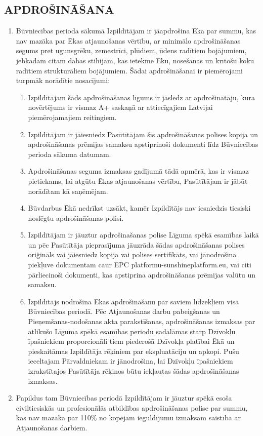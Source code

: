 \begin{multicols}{2}
\subsection{APDROŠINĀŠANA}
\begin{enumerate}
	\item Būvniecības perioda sākumā Izpildītājam ir jāapdrošina Ēka par summu, kas nav mazāka par Ēkas atjaunošanas vērtību, ar minimālo apdrošināšanas segums pret ugunsgrēku, zemestrīci, plūdiem, ūdens radītiem bojājumiem, jebkādām citām dabas stihijām, kas ietekmē Ēku, nosēšanās un krītošu koku radītiem strukturāliem bojājumiem. Šādai apdrošināšanai ir piemērojami turpmāk norādītie nosacījumi:
	\begin{enumerate}
		\item Izpildītājam šāds apdrošināšanas līgums ir jāslēdz ar apdrošinātāju, kura novērtējums ir vismaz A+ saskaņā ar attiecīgajiem Latvijai piemērojamajiem reitingiem.
		\item Izpildītājam ir jāiesniedz Pasūtītājam šīs apdrošināšanas polises kopija un apdrošināšanas prēmijas samaksu apstiprinoši dokumenti līdz Būvniecības perioda sākuma datumam.
		\item Apdrošināšanas seguma izmaksas gadījumā tādā apmērā, kas ir vismaz pietiekams, lai atgūtu Ēkas atjaunošanas vērtību, Pasūtītājam ir jābūt norādītam kā saņēmējam.
		\item Būvdarbus Ēkā nedrīkst uzsākt, kamēr Izpildītājs nav iesniedzis tiesiski noslēgtu apdrošināšanas polisi.
		\item Izpildītājam ir jāuztur apdrošinašanas polise Līguma spēkā esamības laikā un pēc Pasūtītāja pieprasījuma jāuzrāda šādas apdrošināšanas polises oriģināls vai jāiesniedz kopija vai polises sertifikāts, vai jānodrošina piekļuve dokumentam caur EPC platformu-sunshineplatform.eu, vai citi pārliecinoši dokumenti, kas apstiprina apdrošināšanas prēmijas valūtu un samaksu.
		\item Izpildītājs nodrošina Ēkas apdrošināšanu par saviem līdzekļiem visā Būvniecības periodā. Pēc Atjaunošanas darbu pabeigšanas un Pieņemšanas-nodošanas akta parakstīšanas, apdrošināšanas izmaksas par atlikušo Līguma spēkā esamības periodu sadalāmas starp Dzīvokļu īpašniekiem proporcionāli tiem piederošā Dzīvokļa platībai Ēkā un pieskaitāmas Izpildītāja rēķiniem par ekspluatāciju un apkopi. Pušu ieceltajam Pārvaldniekam ir jānodrošina, lai Dzīvokļu īpašniekiem izrakstītajos Pasūtītāja rēķinos būtu iekļautas šādas apdrošināšanas izmaksas.
	\end{enumerate}
	\item Papildus tam Būvniecības periodā Izpildītājam ir jāuztur spēkā esoša civiltiesiskās un profesionālās atbildības apdrošināšanas polise par summu, kas nav mazāka par 110\% no kopējām ieguldījumu izmaksām saistībā ar  Atjaunošanas darbiem.
\end{enumerate}


\end{multicols}
